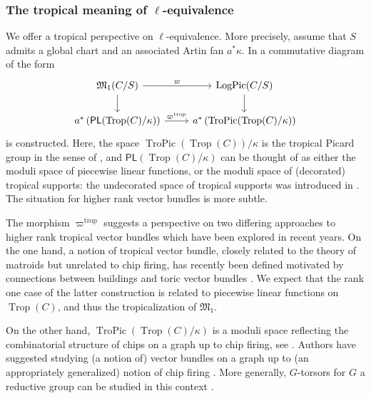 \documentclass[11pt]{amsart}
\theoremstyle{definition}
\theoremstyle{definition}
\begin{document}
\subsubsection{The tropical meaning of $\ell$-equivalence}\label{sec:TropicalVBmeaning}
We offer a tropical perspective on $\ell$-equivalence. More precisely, assume that $S$ admits a global chart and an associated Artin fan $a^\ast \kappa$. In \cite{Kennedy-Hunt-Poiret-Song:Log-Vector-bundle} a commutative diagram of the form 
$$
\begin{tikzcd}
\mathfrak{M}_1(C/S) \arrow[r, "\varpi"] \arrow[d] & \operatorname{LogPic}(C/S) \arrow[d] \\
a^\ast\left( \mathsf{PL}(\operatorname{Trop}(C)/\kappa)\right) \arrow[r,"\varpi^{\operatorname{trop}}"] & a^\ast \left(\operatorname{TroPic}(\operatorname{Trop}(C)/\kappa)\right)
\end{tikzcd}
$$
is constructed. Here, the space $\operatorname{TroPic}(\operatorname{Trop}(C))/\kappa$ is the tropical Picard group in the sense of \cite{MolchoWise}, and $\mathsf{PL}(\operatorname{Trop}(C)/\kappa)$ can be thought of as either the moduli space of piecewise linear functions, or the moduli space of (decorated) tropical supports: the undecorated space of tropical supports was introduced in \cite{kennedy2023logarithmic}. The situation for higher rank vector bundles is more subtle.

The morphism $\varpi^{\operatorname{trop}}$ suggests a perspective on two differing approaches to higher rank tropical vector bundles which have been explored in recent years. 
On the one hand, a notion of tropical vector bundle, closely related to the theory of matroids but unrelated to chip firing, has recently been defined \cite{KavehManonTropVB,KhanMaclagan2026} motivated by connections between buildings and toric vector bundles \cite{KavehManon2022}. We expect that the rank one case of the latter construction is related to piecewise linear functions on $\operatorname{Trop}(C)$, and thus the tropicalization of $\mathfrak{M}_1$. 

On the other hand, $\operatorname{TroPic}(\operatorname{Trop}(C)/\kappa)$ is a moduli space reflecting the combinatorial structure of chips on a graph up to chip firing, see \cite{Baker2008,BakerNorine2007,GathmannKerber2008,MikhalkinZharkov2008}. Authors have suggested studying (a notion of) vector bundles on a graph up to (an appropriately generalized) notion of chip firing \cite{Allermann2012,GrossKaurWernerTropical,GrossZakharov2022}. More generally, $G$-torsors for $G$ a reductive group can be studied in this context \cite{GrossKaurWernerTropical}. 
\end{document}
